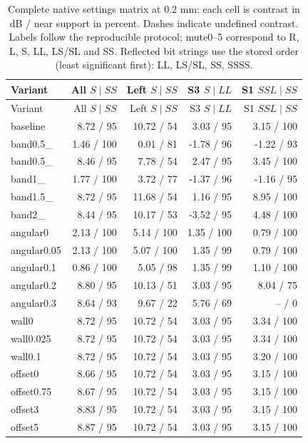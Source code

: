 \begingroup\small\setlength{\tabcolsep}{3pt}
\begin{longtable}{@{}lrrrr@{}}
\caption{Complete native settings matrix at 0.2 mm: each cell is contrast in dB / near support in percent. Dashes indicate undefined contrast. Labels follow the reproducible protocol; mute0--5 correspond to R, L, S, LL, LS/SL and SS. Reflected bit strings use the stored order (least significant first): LL, LS/SL, SS, SSSS.}\label{saftapp:settings_matrix}\\
\toprule Variant & All $S\mid SS$ & Left $S\mid SS$ & S3 $S\mid LL$ & S1 $SSL\mid SS$\\\midrule\endfirsthead
\toprule Variant & All $S\mid SS$ & Left $S\mid SS$ & S3 $S\mid LL$ & S1 $SSL\mid SS$\\\midrule\endhead
baseline & 8.72 / 95 & 10.72 / 54 & 3.03 / 95 & 3.15 / 100\\
band0.5\_\allowbreak 3 & 1.46 / 100 & 0.01 / 81 & -1.78 / 96 & -1.22 / 93\\
band0.5\_\allowbreak 5 & 8.46 / 95 & 7.78 / 54 & 2.47 / 95 & 3.45 / 100\\
band1\_\allowbreak 3 & 1.77 / 100 & 3.72 / 77 & -1.37 / 96 & -1.16 / 95\\
band1.5\_\allowbreak 5 & 8.72 / 95 & 11.68 / 54 & 1.16 / 95 & 8.95 / 100\\
band2\_\allowbreak 5 & 8.44 / 95 & 10.17 / 53 & -3.52 / 95 & 4.48 / 100\\
angular0 & 2.13 / 100 & 5.14 / 100 & 1.35 / 100 & 0.79 / 100\\
angular0.05 & 2.13 / 100 & 5.07 / 100 & 1.35 / 99 & 0.79 / 100\\
angular0.1 & 0.86 / 100 & 5.05 / 98 & 1.35 / 99 & 1.10 / 100\\
angular0.2 & 8.80 / 95 & 10.13 / 51 & 3.03 / 95 & 8.04 / 75\\
angular0.3 & 8.64 / 93 & 9.67 / 22 & 5.76 / 69 & -- / 0\\
wall0 & 8.72 / 95 & 10.72 / 54 & 3.03 / 95 & 3.34 / 100\\
wall0.025 & 8.72 / 95 & 10.72 / 54 & 3.03 / 95 & 3.34 / 100\\
wall0.1 & 8.72 / 95 & 10.72 / 54 & 3.03 / 95 & 3.20 / 100\\
offset0 & 8.66 / 95 & 10.72 / 54 & 3.03 / 95 & 3.15 / 100\\
offset0.75 & 8.67 / 95 & 10.72 / 54 & 3.03 / 95 & 3.15 / 100\\
offset3 & 8.83 / 95 & 10.72 / 54 & 3.03 / 95 & 3.15 / 100\\
offset5 & 8.87 / 95 & 10.72 / 54 & 3.03 / 95 & 3.15 / 100\\

\end{longtable}
